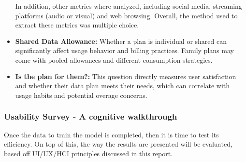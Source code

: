 \documentclass[conference]{IEEEtran}
\begin{document}
\begin{itemize}
    In addition, other metrics where analyzed, including social media, streaming platforms (audio or visual) and web browsing. Overall, the method used to extract these metrics was multiple choice.
    \item \textbf{Shared Data Allowance:} Whether a plan is individual or shared can significantly affect usage behavior and billing practices. Family plans may come with pooled allowances and different consumption strategies.
    \item \textbf{Is the plan for them?:} This question directly measures user satisfaction and whether their data plan meets their needs, which can correlate with usage habits and potential overage concerns.
\end{itemize}
\subsubsection{Usability Survey - A cognitive walkthrough}
Once the data to train the model is completed, then it is time to test its efficiency. On top of this, the way the results are presented will be evaluated, based off UI/UX/HCI principles discussed in this report. 
\end{document}
